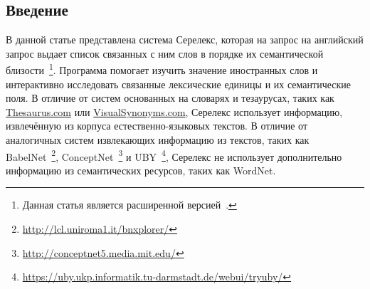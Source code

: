 \documentclass[a4paper,10pt,twoside]{article}
\begin{document}

\author{Панченко А.И.${}^{1,2}$, Романов П.В.${}^2$, Романов А.В${}^1$, \linebreak Филиппович А.Ю.${}^2$, Морозова О.И.${}^1$, Филиппович Ю.Н.${}^2$}



\subsection{Введение}

В данной статье представлена система Серелекс, которая на запрос на английский запрос выдает список связанных с ним слов в порядке их семантической близости~\footnote{Данная статья является расширенной версией~\cite{panchenko2013serelex}.}. Программа помогает изучить значение иностранных слов и интерактивно исследовать связанные лексические единицы и их семантические поля. В отличие от систем основанных на словарях и тезаурусах, таких как \url{Thesaurus.com} или \url{VisualSynonyms.com}, Серелекс использует информацию, извлечённую из корпуса естественно-языковых текстов. В отличие от аналогичных систем извлекающих информацию из текстов, таких как BabelNet~\footnote{ \url{http://lcl.uniroma1.it/bnxplorer/}}, ConceptNet~\footnote{ \url{http://conceptnet5.media.mit.edu/}} и UBY~\footnote{\url{https://uby.ukp.informatik.tu-darmstadt.de/webui/tryuby/}}, Серелекс не использует дополнительно информацию из семантических ресурсов, таких как WordNet. 
\end{document}
